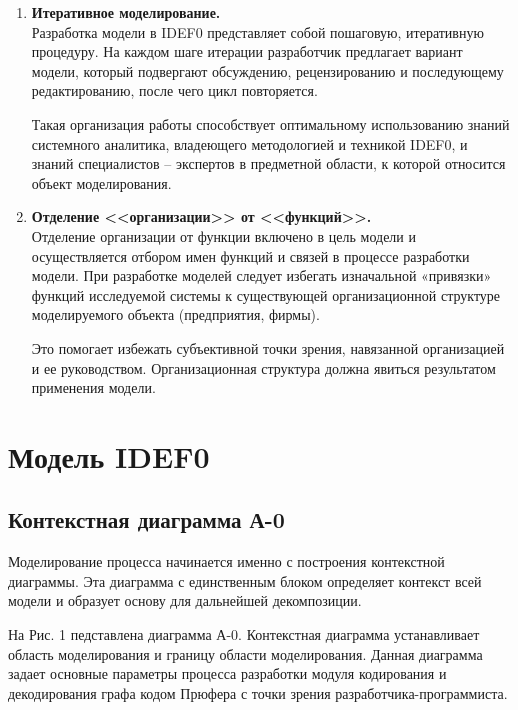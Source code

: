 \documentclass[a4paper, final]{article}
\begin{document}
\begin{enumerate}
	\item {\bf Итеративное моделирование.} \\
Разработка модели в IDEF0 представляет собой пошаговую, итеративную процедуру. На каждом шаге итерации разработчик 
предлагает вариант модели, который подвергают обсуждению, рецензированию и последующему редактированию, после чего 
цикл повторяется. 

Такая организация работы способствует оптимальному использованию знаний системного аналитика, владеющего методологией 
и техникой IDEF0, и знаний специалистов – экспертов в предметной области, к которой относится объект моделирования.

	\item {\bf Отделение <<организации>> от <<функций>>.} \\
Отделение организации от функции включено в цель модели и осуществляется отбором имен функций и связей в процессе 
разработки модели. При разработке моделей следует избегать изначальной «привязки» функций исследуемой системы к 
существующей организационной структуре моделируемого объекта (предприятия, фирмы). 
\par Это помогает избежать субъективной точки зрения, навязанной организацией и ее руководством. Организационная 
структура должна явиться результатом применения модели. \cite{bib:gost2_idef0}
\end{enumerate}

\newpage
\section{Модель IDEF0}


\subsection{Контекстная диаграмма А-0}

Моделирование процесса начинается именно с построения контекстной диаграммы. Эта диаграмма с единственным блоком определяет
контекст всей модели и образует основу для дальнейшей декомпозиции. 
\par На Рис. 1 педставлена диаграмма А-0. Контекстная диаграмма устанавливает область моделирования и границу 
области моделирования. Данная диаграмма задает основные параметры процесса разработки модуля кодирования и декодирования графа
кодом Прюфера с точки зрения разработчика-программиста. 
\end{document}
